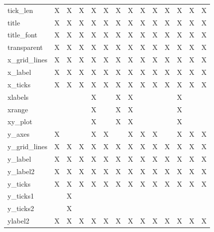 {\begin{table}
\begin{tabular}{|l|c|c|c|c|c|c|c|c|c|c|c|c|c|}
tick\_len              & X & X & X & X & X & X & X & X & X & X & X & X & X \\
title                  & X & X & X & X & X & X & X & X & X & X & X & X & X \\
title\_font            & X & X & X & X & X & X & X & X & X & X & X & X & X \\
transparent            & X & X & X & X & X & X & X & X & X & X & X & X & X \\
x\_grid\_lines         & X & X & X & X & X & X & X & X & X & X & X & X & X \\
x\_label               & X & X & X & X & X & X & X & X & X & X & X & X & X \\
x\_ticks               & X & X & X & X & X & X & X & X & X & X & X & X & X \\
xlabels                &   &   &   & X &   & X & X &   &   &   & X &   &   \\
xrange                 &   &   &   & X &   & X & X &   &   &   & X &   &   \\
xy\_plot               &   &   &   & X &   & X & X &   &   &   & X &   &   \\
y\_axes                & X &   &   & X & X &   & X & X & X &   & X & X & X \\
y\_grid\_lines         & X & X & X & X & X & X & X & X & X & X & X & X & X \\
y\_label               & X & X & X & X & X & X & X & X & X & X & X & X & X \\
y\_label2              & X & X & X & X & X & X & X & X & X & X & X & X & X \\
y\_ticks               & X & X & X & X & X & X & X & X & X & X & X & X & X \\
y\_ticks1              &   & X &   &   &   &   &   &   &   &   &   &   &   \\
y\_ticks2              &   & X &   &   &   &   &   &   &   &   &   &   &   \\
ylabel2                & X & X & X & X & X & X & X & X & X & X & X & X & X \\
\hline
\end{tabular}
\end{table}
}

